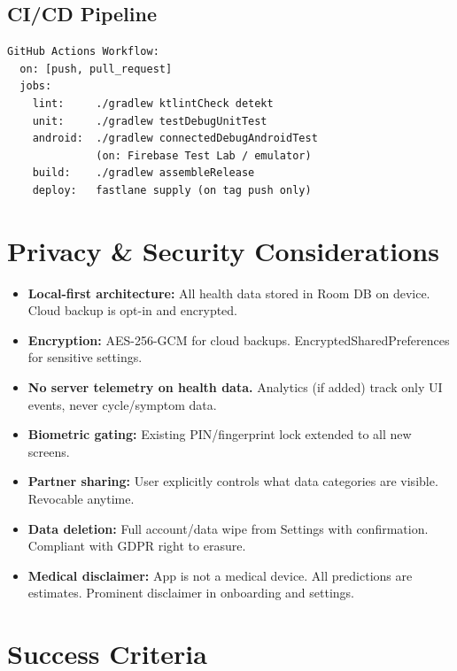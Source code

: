 \documentclass[12pt,a4paper]{article}
\begin{document}
\subsection{CI/CD Pipeline}
\begin{lstlisting}
GitHub Actions Workflow:
  on: [push, pull_request]
  jobs:
    lint:     ./gradlew ktlintCheck detekt
    unit:     ./gradlew testDebugUnitTest
    android:  ./gradlew connectedDebugAndroidTest
              (on: Firebase Test Lab / emulator)
    build:    ./gradlew assembleRelease
    deploy:   fastlane supply (on tag push only)
\end{lstlisting}

\section{Privacy \& Security Considerations}

\begin{itemize}[leftmargin=1.5em]
  \item \textbf{Local-first architecture:} All health data stored in Room DB on device. Cloud backup is opt-in and encrypted.
  \item \textbf{Encryption:} AES-256-GCM for cloud backups. EncryptedSharedPreferences for sensitive settings.
  \item \textbf{No server telemetry on health data.} Analytics (if added) track only UI events, never cycle/symptom data.
  \item \textbf{Biometric gating:} Existing PIN/fingerprint lock extended to all new screens.
  \item \textbf{Partner sharing:} User explicitly controls what data categories are visible. Revocable anytime.
  \item \textbf{Data deletion:} Full account/data wipe from Settings with confirmation. Compliant with GDPR right to erasure.
  \item \textbf{Medical disclaimer:} App is not a medical device. All predictions are estimates. Prominent disclaimer in onboarding and settings.
\end{itemize}

\section{Success Criteria}
\end{document}
